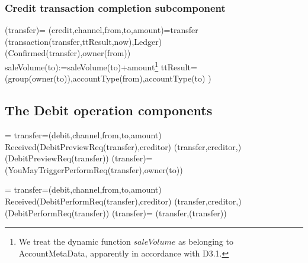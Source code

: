  \subsubsection{Credit transaction completion subcomponent}
 \begin{asm}
 	(transfer)=\+  
 	\LET (credit,channel,from,to,amount)=transfer \\ 
 	(transaction(transfer,ttResult,now),Ledger)\\
 	(Confirmed(transfer),\TO owner(from))\\
 	saleVolume(to):=saleVolume(to)+amount\footnote{We treat the dynamic function $saleVolume$ as belonging to AccountMetaData, apparently in accordance with D3.1.} \-
 	\WHERE \+
 	ttResult= (group(owner(to)),accountType(from),accountType(to) )
 \end{asm}
 
 \subsection{The Debit operation components}
 

\begin{asm}
	  =\+
	\LET transfer=(debit,channel,from,to,amount)\\
	\IF Received(DebitPreviewReq(transfer),\FROM creditor) \THEN \+   
	(transfer,creditor,)\\
	(DebitPreviewReq(transfer)) \-
	\WHERE \+
	(transfer)=\+
	  (YouMayTriggerPerformReq(transfer),\TO  owner(to)) 
\end{asm}
 

\begin{asm}
	  =\+
	\LET 	transfer=(debit,channel,from,to,amount)\\
	\IF Received(DebitPerformReq(transfer),\FROM creditor) \THEN \+  
	(transfer,creditor,)\\
	(DebitPerformReq(transfer))\-
	\WHERE \+
	(transfer)=\+
	(transfer,(transfer))
\end{asm}

